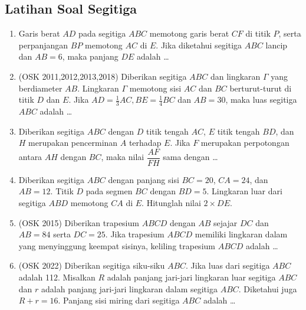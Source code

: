 \subsection{Latihan Soal Segitiga }
\begin{enumerate}    
    \item Garis berat $AD$ pada segitiga $ABC$ memotong garis berat $CF$ di titik $P$, serta perpanjangan $BP$ memotong $AC$ di $E$. Jika diketahui segitiga $ABC$ lancip dan $AB=6$, maka panjang $DE$ adalah \dots

    \item (OSK 2011,2012,2013,2018) Diberikan segitiga $ABC$ dan lingkaran $\Gamma$ yang berdiameter $AB$. Lingkaran $\Gamma$ memotong sisi $AC$ dan $BC$ berturut-turut di titik $D$ dan $E$. Jika $AD = \frac13 AC, BE =\frac14 BC$ dan $AB = 30$, maka luas segitiga $ABC$ adalah \dots
		
    \item Diberikan segitiga $ABC$ dengan $D$ titik tengah $AC$, $E$ titik tengah $BD$, dan $H$ merupakan pencerminan $A$ terhadap $E$. Jika $F$ merupakan perpotongan antara $AH$ dengan $BC$, maka nilai $\dfrac{AF}{FH}$ sama dengan \dots
		 
    \item Diberikan segitiga $ABC$ dengan panjang sisi $BC = 20$, $CA = 24$, dan $AB=12$. Titik $D$ pada segmen $BC$ dengan $BD = 5$. Lingkaran luar dari segitiga $ABD$ memotong $CA$ di $E$. Hitunglah nilai $2 \times DE$.

    \item (OSK 2015) Diberikan trapesium $ABCD$ dengan $AB$ sejajar $DC$ dan $AB = 84$ serta $DC = 25$. Jika trapesium $ABCD$ memiliki lingkaran dalam yang menyinggung keempat sisinya, keliling trapesium $ABCD$ adalah \ldots

    \item (OSK 2022) Diberikan segitiga siku-siku $ABC$. Jika luas dari segitiga $ABC$ adalah 112. Misalkan $R$ adalah panjang jari-jari lingkaran luar segitiga $ABC$ dan $r$ adalah panjang jari-jari lingkaran dalam segitiga $ABC$. Diketahui juga $R + r = 16$. Panjang sisi miring dari segitiga $ABC$ adalah \ldots
\end{enumerate}